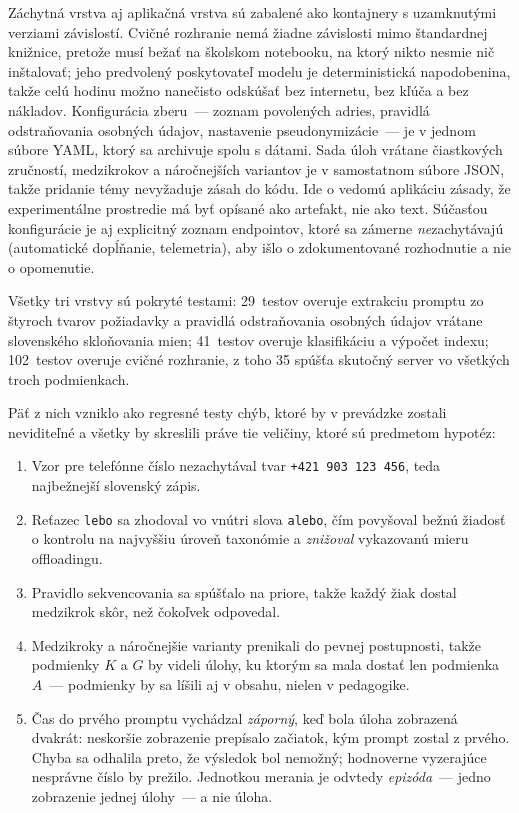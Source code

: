 Záchytná vrstva aj aplikačná vrstva sú zabalené ako kontajnery s uzamknutými verziami závislostí. Cvičné rozhranie nemá žiadne závislosti mimo štandardnej knižnice, pretože musí bežať na školskom notebooku, na ktorý nikto nesmie nič inštalovať; jeho predvolený poskytovateľ modelu je deterministická napodobenina, takže celú hodinu možno nanečisto odskúšať bez internetu, bez kľúča a bez nákladov. Konfigurácia zberu~--- zoznam povolených adries, pravidlá odstraňovania osobných údajov, nastavenie pseudonymizácie~--- je v jednom súbore YAML, ktorý sa archivuje spolu s dátami. Sada úloh vrátane čiastkových zručností, medzikrokov a náročnejších variantov je v samostatnom súbore JSON, takže pridanie témy nevyžaduje zásah do kódu. Ide o vedomú aplikáciu zásady, že experimentálne prostredie má byť opísané ako artefakt, nie ako text. Súčasťou konfigurácie je aj explicitný zoznam endpointov, ktoré sa zámerne \emph{ne}zachytávajú (automatické dopĺňanie, telemetria), aby išlo o zdokumentované rozhodnutie a nie o opomenutie.

Všetky tri vrstvy sú pokryté testami: 29~testov overuje extrakciu promptu zo štyroch tvarov požiadavky a pravidlá odstraňovania osobných údajov vrátane slovenského skloňovania mien; 41~testov overuje klasifikáciu a výpočet indexu; 102~testov overuje cvičné rozhranie, z toho 35 spúšťa skutočný server vo všetkých troch podmienkach.

Päť z nich vzniklo ako regresné testy chýb, ktoré by v prevádzke zostali neviditeľné a všetky by skreslili práve tie veličiny, ktoré sú predmetom hypotéz:

\begin{enumerate}[nosep]
    \item Vzor pre telefónne číslo nezachytával tvar \texttt{+421~903~123~456}, teda najbežnejší slovenský zápis.
    \item Reťazec \texttt{lebo} sa zhodoval vo vnútri slova \texttt{alebo}, čím povyšoval bežnú žiadosť o kontrolu na najvyššiu úroveň taxonómie a \emph{znižoval} vykazovanú mieru offloadingu.
    \item Pravidlo sekvencovania sa spúšťalo na priore, takže každý žiak dostal medzikrok skôr, než čokoľvek odpovedal.
    \item Medzikroky a náročnejšie varianty prenikali do pevnej postupnosti, takže podmienky $K$ a $G$ by videli úlohy, ku ktorým sa mala dostať len podmienka $A$~--- podmienky by sa líšili aj v obsahu, nielen v pedagogike.
    \item Čas do prvého promptu vychádzal \emph{záporný}, keď bola úloha zobrazená dvakrát: neskoršie zobrazenie prepísalo začiatok, kým prompt zostal z prvého. Chyba sa odhalila preto, že výsledok bol nemožný; hodnoverne vyzerajúce nesprávne číslo by prežilo. Jednotkou merania je odvtedy \emph{epizóda}~--- jedno zobrazenie jednej úlohy~--- a nie úloha.
\end{enumerate}

